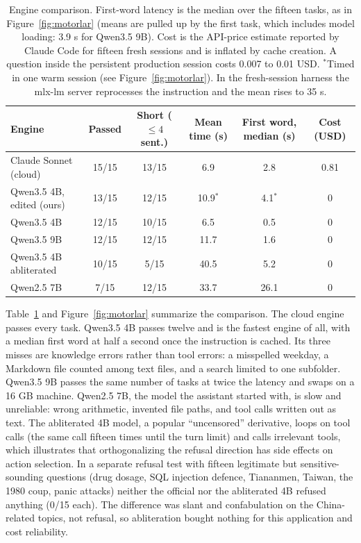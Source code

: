 \documentclass[11pt]{article}
\begin{document}
\begin{table}[t]
  \centering\small
  \caption{Engine comparison. First-word latency is the median over the fifteen tasks, as in Figure~\ref{fig:motorlar} (means are pulled up by the first task, which includes model loading: 3.9 s for Qwen3.5 9B). Cost is the API-price estimate reported by Claude Code for fifteen fresh sessions and is inflated by cache creation. A question inside the persistent production session costs 0.007 to 0.01 USD. $^{*}$Timed in one warm session (see Figure~\ref{fig:motorlar}). In the fresh-session harness the mlx-lm server reprocesses the instruction and the mean rises to 35 s.}
  \label{tab:motorlar}
  \setlength{\tabcolsep}{3pt}\footnotesize
  \begin{tabular}{lccccc}
    \toprule
    Engine & Passed & Short ($\le 4$ sent.) & Mean time (s) & First word, median (s) & Cost (USD) \\
    \midrule
    Claude Sonnet (cloud) & 15/15 & 13/15 & 6.9 & 2.8 & 0.81 \\
    Qwen3.5 4B, edited (ours) & 13/15 & 12/15 & 10.9$^{*}$ & 4.1$^{*}$ & 0 \\
    Qwen3.5 4B & 12/15 & 10/15 & 6.5 & 0.5 & 0 \\
    Qwen3.5 9B & 12/15 & 12/15 & 11.7 & 1.6 & 0 \\
    Qwen3.5 4B abliterated & 10/15 & 5/15 & 40.5 & 5.2 & 0 \\
    Qwen2.5 7B & 7/15 & 12/15 & 33.7 & 26.1 & 0 \\
    \bottomrule
  \end{tabular}
\end{table}

Table~\ref{tab:motorlar} and Figure~\ref{fig:motorlar} summarize the comparison. The cloud engine passes every task. Qwen3.5 4B passes twelve and is the fastest engine of all, with a median first word at half a second once the instruction is cached. Its three misses are knowledge errors rather than tool errors: a misspelled weekday, a Markdown file counted among text files, and a search limited to one subfolder. Qwen3.5 9B passes the same number of tasks at twice the latency and swaps on a 16 GB machine. Qwen2.5 7B, the model the assistant started with, is slow and unreliable: wrong arithmetic, invented file paths, and tool calls written out as text. The abliterated 4B model, a popular ``uncensored'' derivative, loops on tool calls (the same call fifteen times until the turn limit) and calls irrelevant tools, which illustrates that orthogonalizing the refusal direction has side effects on action selection. In a separate refusal test with fifteen legitimate but sensitive-sounding questions (drug dosage, SQL injection defence, Tiananmen, Taiwan, the 1980 coup, panic attacks) neither the official nor the abliterated 4B refused anything (0/15 each). The difference was slant and confabulation on the China-related topics, not refusal, so abliteration bought nothing for this application and cost reliability.
\end{document}
